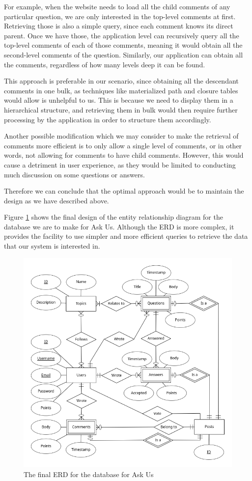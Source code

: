 For example, when the website needs to load all the child comments of any particular question, we are only interested in the top-level comments at first. Retrieving those is also a simple query, since each comment knows its direct parent. Once we have those, the application level can recursively query all the top-level comments of each of those comments, meaning it would obtain all the second-level comments of the question. Similarly, our application can obtain all the comments, regardless of how many levels deep it can be found.

This approach is preferable in our scenario, since obtaining all the descendant comments in one bulk, as techniques like materialized path and closure tables would allow is unhelpful to us. This is because we need to display them in a hierarchical structure, and retrieving them in bulk would then require further processing by the application in order to structure them accordingly.

Another possible modification which we may consider to make the retrieval of comments more efficient is to only allow a single level of comments, or in other words, not allowing for comments to have child comments. However, this would cause a detriment in user experience, as they would be limited to conducting much discussion on some questions or answers.

Therefore we can conclude that the optimal approach would be to maintain the design as we have described above.

Figure \ref{erd2} shows the final design of the entity relationship diagram for the database we are to make for Ask Us. Although the ERD is more complex, it provides the facility to use simpler and more efficient queries to retrieve the data that our system is interested in.

\begin{figure}[p]
	\centering
	\includegraphics[width=\linewidth]{../../ERD/erd.png}
	\caption{The final ERD for the database for Ask Us}
	\label{erd2}
\end{figure}